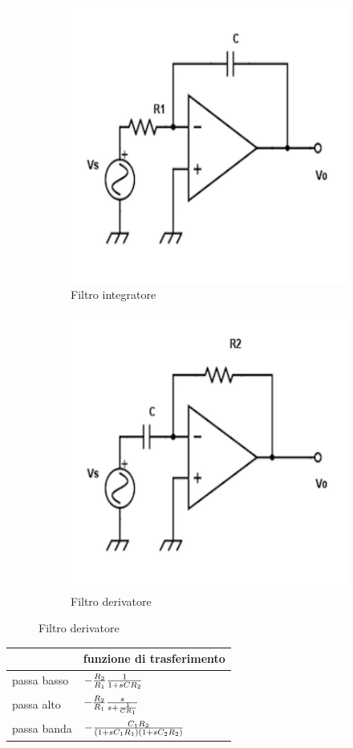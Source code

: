 \documentclass[a4paper,portrait,12pt]{article}
\theoremstyle{definition}
\begin{document}
\begin{figure}[H]
\begin{subfigure}{.5\textwidth}
\centering
\includegraphics[width=.5\linewidth]{img/integratore.pdf}
\caption{Filtro integratore}
\label{fig:integratore}
\end{subfigure}
\begin{subfigure}{.5\textwidth}
\centering
\includegraphics[width=.5\linewidth]{img/derivatore.pdf}
\caption{Filtro derivatore}
\label{fig:derivatore}
\end{subfigure}
\end{figure}

\begin{table}[H]
\begin{center}
\begin{tabular}{|l|l|}
\hline
\hline & funzione di trasferimento\\
\hline
\hline \rule[-4mm]{0mm}{1cm} passa basso & $-{R_2 \over R_1}{1 \over 1 + sCR_2}$\\
\hline \rule[-4mm]{0mm}{1cm} passa alto & $-{R_2 \over R_1}{s \over s + {1 \over CR_1}}$\\
\hline \rule[-4mm]{0mm}{1cm} passa banda & $-{C_1R_2 \over (1 + sC_1R_1)(1 + sC_2R_2)}$\\
\hline
\end{tabular}
\end{center}
\end{table}
\end{document}
